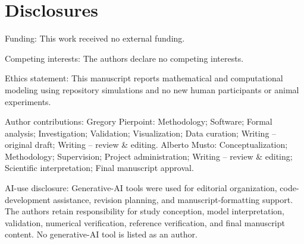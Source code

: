 \section*{Disclosures}

Funding: This work received no external funding.

Competing interests: The authors declare no competing interests.

Ethics statement: This manuscript reports mathematical and computational modeling using repository simulations and no new human participants or animal experiments.

Author contributions: Gregory Pierpoint: Methodology; Software; Formal analysis; Investigation; Validation; Visualization; Data curation; Writing -- original draft; Writing -- review \& editing. Alberto Musto: Conceptualization; Methodology; Supervision; Project administration; Writing -- review \& editing; Scientific interpretation; Final manuscript approval.

AI-use disclosure: Generative-AI tools were used for editorial organization, code-development assistance, revision planning, and manuscript-formatting support. The authors retain responsibility for study conception, model interpretation, validation, numerical verification, reference verification, and final manuscript content. No generative-AI tool is listed as an author.
